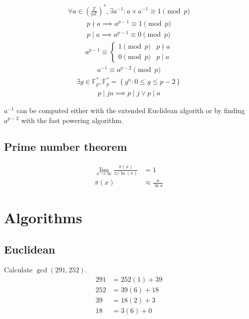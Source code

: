 \documentclass{article}
\newcommand{\curly}[1]{\left\{ #1 \right\}}
\newcommand{\soft}[1]{\left( #1 \right)}
\begin{document}
\begin{multicols*}{2}
\begin{align*}
    \forall a \in \soft{\frac{\mathbb{Z}}{p\mathbb{Z}}}^*, \exists a^{-1} : a \times a^{-1} \equiv 1 \pmod{p}
\end{align*}
\begin{align*}
    p \nmid a \implies a^{p-1} \equiv 1 \pmod{p} \\
    p  \mid a \implies a^{p-1} \equiv 0 \pmod{p}
\end{align*}
\begin{align*}
    a^{p-1} \equiv \begin{cases}
        1 \pmod{p} & p \nmid a \\
        0 \pmod{p} & p  \mid a
    \end{cases}
\end{align*}
\begin{align*}
    a^{-1} \equiv a^{p-2} \pmod{p}
\end{align*}
\begin{align*}
    \exists g \in \mathbb{F}_p^* , \mathbb{F}_p^* = \curly{g^n : 0 \leq g \leq p - 2}
\end{align*}
\begin{align*}
    p \mid ja \implies p \mid j \vee p \mid a
\end{align*}

$a^{-1}$ can be computed either with the extended Euclidean algorith or by finding $a^{p-2}$ with the fast powering algorithm.

\subsection*{Prime number theorem}
\begin{align*}
    \lim_{x \rightarrow \infty} \frac{\pi(x)}{x / \ln(x)} &= 1 \\
    \pi(x) &\approx \frac{x}{\ln x}
\end{align*}

\end{multicols*}

\section*{Algorithms}

\subsection*{Euclidean}
Calculate $\gcd(291, 252)$.
\begin{align*}
    291 &= 252(1) + 39        \\
    252 &= 39(6)  + 18        \\
    39  &= 18(2)  + \boxed{3} \\
    18  &= 3(6)   + 0
\end{align*}
\end{document}
